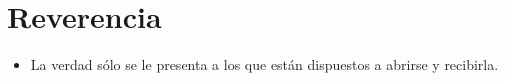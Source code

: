 \section{Reverencia}
\begin{itemize}
    \item La verdad sólo se le presenta a los que están dispuestos a abrirse y recibirla.
\end{itemize}
